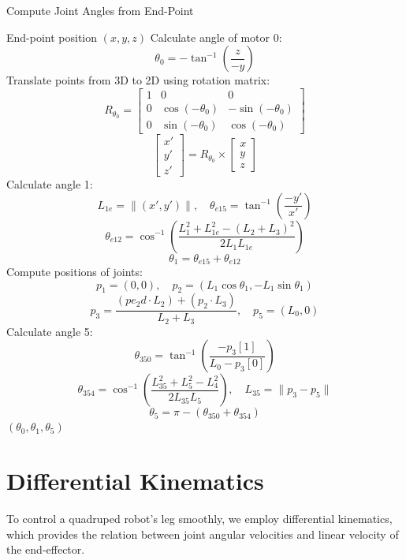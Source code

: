 \documentclass[a4paper,11pt]{article}
\begin{document}
\begin{algorithm}[H]
	\caption{Compute Joint Angles from End-Point}
	\begin{algorithmic}[1]
			\Require End-point position $(x, y, z)$
			\State Calculate angle of motor 0:
			$$
				\theta_0 = -\tan^{-1} \left( \frac{z}{-y} \right)
			$$
			\State Translate points from 3D to 2D using rotation matrix:
			$$
				R_{\theta_0} =
					\begin{bmatrix}
						1 & 0 & 0 \\
						0 & \cos(-\theta_0) & -\sin(-\theta_0) \\
						0 & \sin(-\theta_0) & \cos(-\theta_0)
					\end{bmatrix}
			$$
			$$
				\begin{bmatrix} x' \\ y' \\ z' \end{bmatrix} = R_{\theta_0} \times \begin{bmatrix} x \\ y \\ z \end{bmatrix}
			$$
			\State Calculate angle 1:
			$$
				L_{1e} = \| (x', y') \|, \quad
				\theta_{e15} = \tan^{-1} \left( \frac{-y'}{x'} \right)
			$$
			$$
				\theta_{e12} = \cos^{-1} \left( \frac{L_1^2 + L_{1e}^2 - (L_2 + L_3)^2}{2 L_1 L_{1e}} \right)
			$$
			$$
				\theta_1 = \theta_{e15} + \theta_{e12}
			$$
			\State Compute positions of joints:
			$$
				p_1 = (0, 0), \quad
				p_2 = (L_1 \cos \theta_1, -L_1 \sin \theta_1)
			$$
			$$
				p_3 = \frac{(pe_2d \cdot L_2) + (p_2 \cdot L_3)}{L_2 + L_3}, \quad
				p_5 = (L_0, 0)
			$$
			\State Calculate angle 5:
			$$
				\theta_{350} = \tan^{-1} \left( \frac{-p_3[1]}{L_0 - p_3[0]} \right)
			$$
			$$
				\theta_{354} = \cos^{-1} \left( \frac{L_{35}^2 + L_5^2 - L_4^2}{2 L_{35} L_5} \right), \quad
				L_{35} = \| p_3 - p_5 \|
			$$
			$$
				\theta_5 = \pi - (\theta_{350} + \theta_{354})
			$$
			\State \Return $(\theta_0, \theta_1, \theta_5)$
	\end{algorithmic}
\end{algorithm}

\section{Differential Kinematics}

To control a quadruped robot's leg smoothly, we employ differential kinematics, which provides the relation between joint angular velocities and linear velocity of the end-effector.
\end{document}
